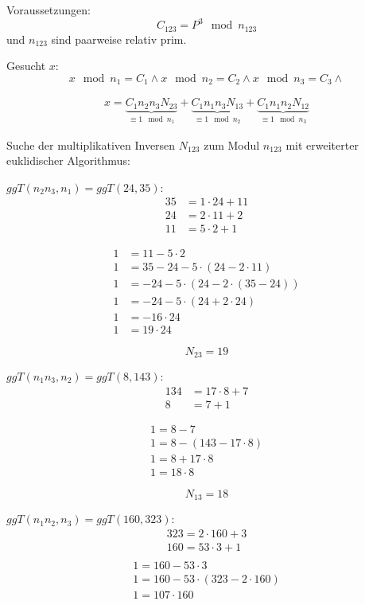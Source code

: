 Voraussetzungen: 
	$$ C_{123} = P^3 \mod n_{123} $$
und $n_{123}$ sind paarweise relativ prim.

Gesucht $x$:
$$ x \mod n_{1} = C_{1} \wedge
   x \mod n_{2} = C_{2} \wedge
   x \mod n_{3} = C_{3} \wedge   $$

\begin{align}
	x = \underbrace{C_{1} n_{2} n_{3} N_{23}}_{\equiv 1 \mod n_1}
	  + \underbrace{C_{1} n_{1} n_{3} N_{13}}_{\equiv 1 \mod n_2}
	  + \underbrace{C_{1} n_{1} n_{2} N_{12}}_{\equiv 1 \mod n_3}
\end{align}

Suche der multiplikativen Inversen $N_{123}$ zum Modul $n_{123}$ mit erweiterter euklidischer Algorithmus:

$ggT(n_{2}n_{3},n_{1}) = ggT(24,35):$
\begin{align}
35 &= 1 \cdot 24+11			\\
24 &= 2 \cdot 11+2			\\
11 &= 5 \cdot 2+1			
\end{align}

\begin{align}
1 &= 11 - 5 \cdot 2						\\
1 &= 35 -24 - 5 \cdot (24-2 \cdot 11)	\\
1 &= -24 -5 \cdot (24-2 \cdot (35-24))  \\
1 &= -24 -5 \cdot (24+2 \cdot 24)		\\
1 &= -16 \cdot 24						\\
1 &=  19 \cdot 24						
\end{align}

$$N_{23} = 19$$

$ggT(n_{1}n_{3}, n_{2}) = ggT(8,143):$
\begin{align}
134   &= 17 \cdot 8+7			\\
8     &= 7+1
\end{align}

\begin{align}
1 = 8 -7						\\
1 = 8 -(143-17 \cdot 8)			\\
1 = 8+17 \cdot 8				\\
1 = 18 \cdot 8					
\end{align}

$$N_{13} = 18$$

$ggT(n_{1}n_{2}, n_{3}) = ggT(160,323):$
\begin{align}
323 = 2 \cdot 160+3\\
160 = 53 \cdot 3+1\\
\end{align}
\begin{align}
1 = 160-53 \cdot 3 \\
1 = 160-53 \cdot (323-2 \cdot 160) \\
1 = 107 \cdot 160
\end{align}

